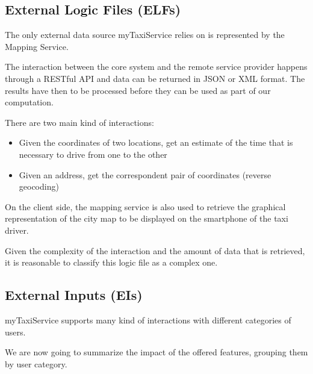 \subsection{External Logic Files (ELFs)}
The only external data source myTaxiService relies on is represented by the Mapping Service. 

The interaction between the core system and the remote service provider happens through a RESTful API and data can be returned in JSON or XML format. The results have then to be processed before they can be used as part of our computation.

There are two main kind of interactions:
\begin{itemize}
	\item Given the coordinates of two locations, get an estimate of the time that is necessary to drive from one to the other
	\item Given an address, get the correspondent pair of coordinates (reverse geocoding) 
\end{itemize}

On the client side, the mapping service is also used to retrieve the graphical representation of the city map to be displayed on the smartphone of the taxi driver.

Given the complexity of the interaction and the amount of data that is retrieved, it is reasonable to classify this logic file as a complex one. 

\subsection{External Inputs (EIs)}
myTaxiService supports many kind of interactions with different categories of users. 

We are now going to summarize the impact of the offered features, grouping them by user category.

